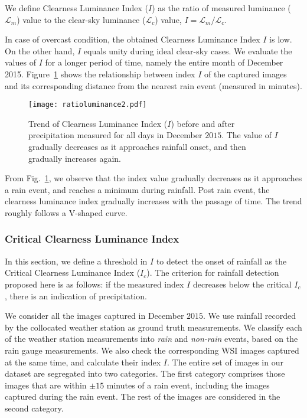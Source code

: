 We define Clearness Luminance Index ($I$) as the ratio of measured luminance ($\mathcal{L}_m$) value to the clear-sky luminance ($\mathcal{L}_c$) value, $I = \mathcal{L}_m/\mathcal{L}_c$. 

In case of overcast condition, the obtained Clearness Luminance Index $I$ is low. On the other hand, $I$ equals unity during ideal clear-sky cases. We evaluate the values of $I$ for a longer period of time, namely the entire month of December 2015. Figure~\ref{fig:CLIvalues} shows the relationship between index $I$ of the captured images and its corresponding distance from the nearest rain event (measured in minutes). 

\begin{figure}[htb]
\centering
\texttt{[image: ratioluminance2.pdf]}
\caption[Trend of Clearness Luminance Index ($I$) w.r.t. proximity of rainfall onset.]{Trend of Clearness Luminance Index ($I$) before and after precipitation measured for all days in December $2015$. The value of $I$ gradually decreases as it approaches rainfall onset, and then gradually increases again. } 
\label{fig:CLIvalues}
\end{figure}

From Fig.~\ref{fig:CLIvalues}, we observe that the index value gradually decreases as it approaches a rain event, and reaches a minimum during rainfall. Post rain event, the clearness luminance index gradually increases with the passage of time. The trend roughly follows a V-shaped curve.

\subsubsection{Critical Clearness Luminance Index}
In this section, we define a threshold in $I$ to detect the onset of rainfall as the Critical Clearness Luminance Index ($I_c$). The criterion for rainfall detection proposed here is as follows: if the measured index $I$ decreases below the critical $I_c$, there is an indication of precipitation. 

We consider all the images captured in December $2015$. We use rainfall recorded by the collocated weather station as ground truth measurements. We classify each of the weather station measurements into \emph{rain} and \emph{non-rain} events, based on the rain gauge measurements. We also check the corresponding WSI images captured at the same time, and calculate their index $I$. The entire set of images in our dataset are segregated into two categories. The first category comprises those images that are within $\pm 15$ minutes of a rain event, including the images captured during the rain event. The rest of the images are considered in the second category.

